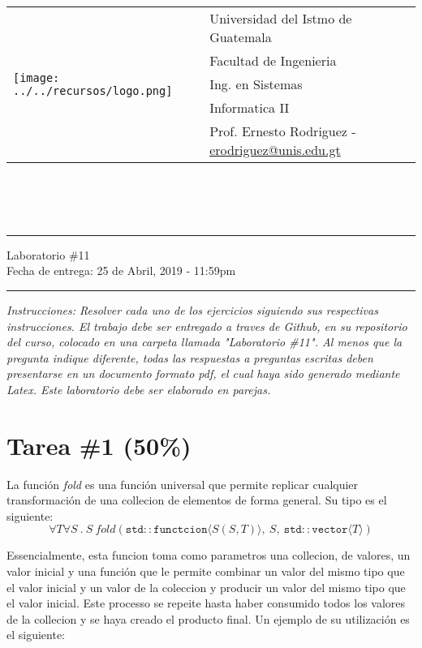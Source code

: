 \documentclass{article}
\newcommand{\horrule}[1]{\rule{\linewidth}{#1}}
\begin{document}
\begin{tabular}{l l}
\multirow{5}{*}{\texttt{[image: ../../recursos/logo.png]}} & Universidad del Istmo de Guatemala \\
 & Facultad de Ingenieria \\
 & Ing. en Sistemas \\
 & Informatica II \\
 & Prof. Ernesto Rodriguez - \href{mailto:erodriguez@unis.edu.gt}{erodriguez@unis.edu.gt} \\
\end{tabular}
\\\\\\

\begin{center}
        \horrule{0.5pt}
        \huge{Laboratorio \#11} \\
        \large{Fecha de entrega: 25 de Abril, 2019 - 11:59pm} \\
        \horrule{1pt}
\end{center}

\emph{Instrucciones: Resolver cada uno de los ejercicios siguiendo sus respectivas
instrucciones. El trabajo debe ser entregado a traves de Github, en su repositorio del curso, colocado en una carpeta llamada "Laboratorio \#11".
Al menos que la pregunta indique diferente, todas las respuestas a preguntas escritas deben presentarse en
un documento formato pdf, el cual haya sido generado mediante Latex. Este laboratorio
debe ser elaborado en parejas.}

\section*{Tarea \#1 (50\%)}

La funci\'on \emph{fold} es una funci\'on universal que permite replicar
cualquier transformaci\'on de una collecion de elementos de forma general.
Su tipo es el siguiente:
\[
        \forall T\forall S\ .\ S\ fold(\mathtt{std::functcion}\langle S(S,T)\rangle,\ S,\ \mathtt{std::vector}\langle T\rangle) 
\]

Essencialmente, esta funcion toma como parametros una collecion, de valores, un valor inicial
y una funci\'on que le permite combinar un valor del mismo tipo que el valor inicial y un
valor de la coleccion y producir un valor del mismo tipo que el valor inicial. Este processo
se repeite hasta haber consumido todos los valores de la collecion y se haya creado el producto
final. Un ejemplo de su utilizaci\'on es el siguiente:
\end{document}
